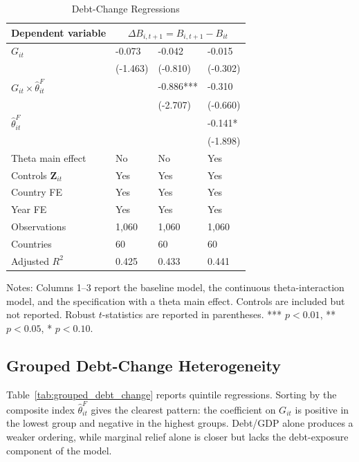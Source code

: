 \begin{table}[H]\centering
\begin{threeparttable}
\caption{Debt-Change Regressions}
\label{tab:debt_change}
\scriptsize
\setlength{\tabcolsep}{3.0pt}
\begin{tabularx}{\textwidth}{lYYY}
\toprule
Dependent variable &  \\
\midrule
$G_{it}$ & -0.073 & -0.042 & -0.015 \\
 & (-1.463) & (-0.810) & (-0.302) \\
$G_{it}\times\widehat\theta^F_{it}$ &  & -0.886*** & -0.310 \\
 &  & (-2.707) & (-0.660) \\
$\widehat\theta^F_{it}$ &  &  & -0.141* \\
 &  &  & (-1.898) \\
\midrule
Theta main effect & No & No & Yes \\
Controls $\mathbf{Z}_{it}$ & Yes & Yes & Yes \\
Country FE & Yes & Yes & Yes \\
Year FE & Yes & Yes & Yes \\
Observations & 1,060 & 1,060 & 1,060 \\
Countries & 60 & 60 & 60 \\
Adjusted $R^2$ & 0.425 & 0.433 & 0.441 \\
\bottomrule
\end{tabularx}
\begin{tablenotes}[flushleft]\footnotesize
\item Notes: Columns 1--3 report the baseline model, the continuous theta-interaction model, and the specification with a theta main effect. Controls are included but not reported. Robust $t$-statistics are reported in parentheses. *** $p<0.01$, ** $p<0.05$, * $p<0.10$.
\end{tablenotes}
\end{threeparttable}
\end{table}

\subsection{Grouped Debt-Change Heterogeneity}

Table~\ref{tab:grouped_debt_change} reports quintile regressions. Sorting by the composite index $\widehat\theta^F_{it}$ gives the clearest pattern: the coefficient on $G_{it}$ is positive in the lowest group and negative in the highest groups. Debt/GDP alone produces a weaker ordering, while marginal relief alone is closer but lacks the debt-exposure component of the model.

